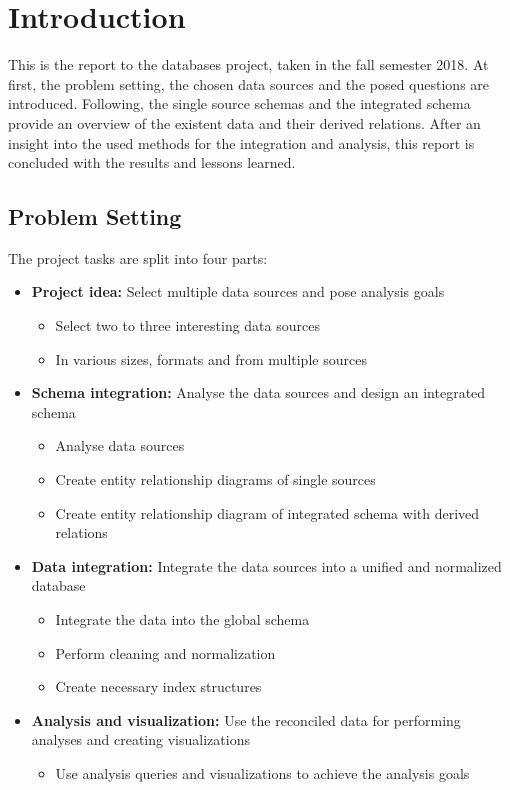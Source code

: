 
\section{Introduction}
This is the report to the databases project, taken in the fall semester 2018. At first, the problem setting, the chosen data sources and the posed questions are introduced. Following, the single source schemas and the integrated schema provide an overview of the existent data and their derived relations. After an insight into the used methods for the integration and analysis, this report is concluded with the results and lessons learned.

\subsection{Problem Setting}
The project tasks are split into four parts:
\begin{itemize}
	\item \textbf{Project idea:} Select multiple data sources and pose analysis goals
	\begin{itemize}
		\item Select two to three interesting data sources
		\item In various sizes, formats and from multiple sources
	\end{itemize}
	\item \textbf{Schema integration:} Analyse the data sources and design an integrated schema
	\begin{itemize}
		\item Analyse data sources
		\item Create entity relationship diagrams of single sources
		\item Create entity relationship diagram of integrated schema with derived relations
	\end{itemize}
	\item \textbf{Data integration:} Integrate the data sources into a unified and normalized database
	\begin{itemize}
		\item Integrate the data into the global schema
		\item Perform cleaning and normalization
		\item Create necessary index structures
	\end{itemize}
	\item \textbf{Analysis and visualization:} Use the reconciled data for performing analyses and creating visualizations
	\begin{itemize}
		\item Use analysis queries and visualizations to achieve the analysis goals
	\end{itemize}
\end{itemize}




